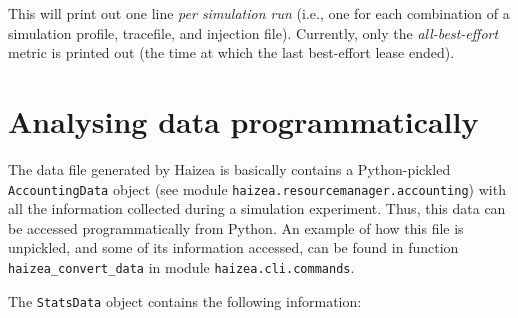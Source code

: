 This will print out one line \emph{per simulation run} (i.e., one for each combination of a simulation profile, tracefile, and injection file). Currently, only the \emph{all-best-effort} metric is printed out (the time at which the last best-effort lease ended).

\section{Analysing data programmatically} 

The data file generated by Haizea is basically contains a Python-pickled \texttt{AccountingData} object (see module \texttt{haizea.resourcemanager.accounting}) with all the information collected during a simulation experiment. Thus, this data can be accessed programmatically from Python. An example of how this file is unpickled, and some of its information accessed, can be found in function \texttt{haizea\_convert\_data} in module \texttt{haizea.cli.commands}.

The \texttt{StatsData} object contains the following information:

